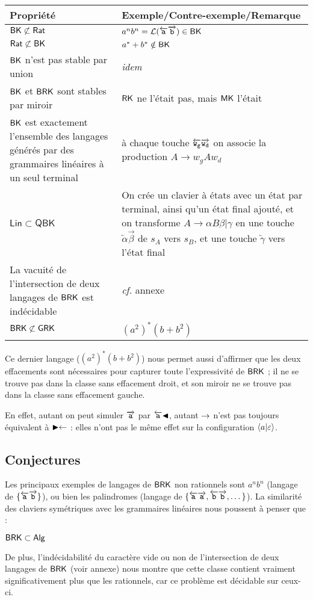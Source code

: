 \documentclass[12pt, a4paper]{article}
\renewcommand{\L}{\mathcal{L}}
\begin{document}
    \begin{tabular}{|p{}|p{}|}
        \hline
        \textbf{Propriété} & \textbf{Exemple/Contre-exemple/Remarque} \\
        \hline
        $\mathsf{BK} \not\subset \mathsf{Rat}$ & $a^nb^n = \L({\egauche{a}\edroite{b}}) \in \BK$ \\
        \hline
        $\mathsf{Rat} \not\subset \mathsf{BK}$ & $a^*+b^* \notin \mathsf{BK}$ \\
        \hline
        $\mathsf{BK}$ n'est pas stable par union & \textit{idem} \\
        \hline
        $\mathsf{BK}$ et $\mathsf{BRK}$ sont stables par miroir & $\mathsf{RK}$ ne l'était pas, mais $\mathsf{MK}$ l'était \\
        \hline
        $\mathsf{BK}$ est exactement l'ensemble des langages générés par des grammaires linéaires à un seul terminal & à chaque touche $\overleftarrow{\mathtt{w_g}}\overrightarrow{\mathtt{w_d}}$ on associe la production $A \rightarrow w_gAw_d$ \\
        \hline
        $\mathsf{Lin} \subset \mathsf{QBK}$ & On crée un clavier à états avec un état par terminal, ainsi qu'un état final ajouté, et on transforme $A \rightarrow \alpha B \beta | \gamma$ en une touche $\overleftarrow{\alpha}\overrightarrow{\beta}$ de $s_A$ vers $s_B$, et une touche $\overleftarrow{\gamma}$ vers l'état final \\
        \hline
        La vacuité de l'intersection de deux langages de $\mathsf{BRK}$ est indécidable & \textit{cf.} annexe \\
        \hline
        $\mathsf{BRK} \not\subset \mathsf{GRK}$ & $(a^2)^*(b+b^2)$ \\
        \hline
    \end{tabular}

    
    Ce dernier langage ($(a^2)^*(b+b^2)$) nous permet aussi d'affirmer que les deux effacements sont nécessaires pour capturer toute l'expressivité de $\mathsf{BRK}$ ; il ne se trouve pas dans la classe sans effacement droit, et son miroir ne se trouve pas dans la classe sans effacement gauche.

    En effet, autant on peut simuler $\overrightarrow{\mathtt{a}}$ par $\overleftarrow{\mathtt{a}} \mathord{\blacktriangleleft}$, autant $\mathord{\rightarrow}$ n'est pas toujours équivalent à $\mathord{\blacktriangleright}\mathord{\leftarrow}$ : elles n'ont pas le même effet sur la configuration $\left\langle a \middle| \varepsilon \right\rangle$.
         
    \subsection{Conjectures}\label{sectionclavsym}
    Les principaux exemples de langages de $\mathsf{BRK}$ non rationnels sont $a^nb^n$ (langage de $\{\overleftarrow{\mathtt{a}}\overrightarrow{\mathtt{b}}\}$), ou bien les palindromes (langage de $\{\overleftarrow{\mathtt{a}}\overrightarrow{\mathtt{a}},\overleftarrow{\mathtt{b}}\overrightarrow{\mathtt{b}}, \dots\}$). La similarité des claviers symétriques avec les grammaires linéaires nous poussent à penser que :
    \begin{example}[Conjecture 1]
        $\mathsf{BRK} \subset \mathsf{Alg}$
    \end{example}
    De plus, l'indécidabilité du caractère vide ou non de l'intersection de deux langages de $\mathsf{BRK}$ (voir annexe) nous montre que cette classe contient vraiment significativement plus que les rationnels, car ce problème est décidable sur ceux-ci.
    
\end{document}
